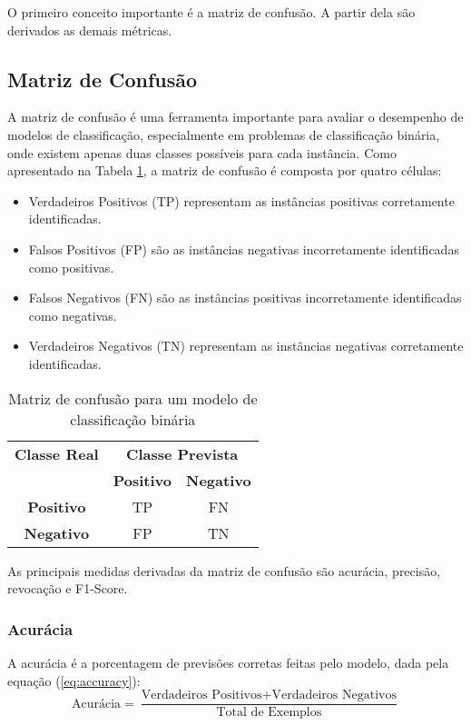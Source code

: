 O primeiro conceito importante é a matriz de confusão.  A partir dela são derivados as demais métricas.

\subsection{Matriz de Confusão}

A matriz de confusão é uma ferramenta importante para avaliar o desempenho de modelos de classificação, especialmente em problemas de classificação binária, onde existem apenas duas classes possíveis para cada instância. Como apresentado na Tabela \ref{tab:confusao}, a matriz de confusão é composta por quatro células:

\begin{itemize}
    \item Verdadeiros Positivos (TP) representam as instâncias positivas corretamente identificadas.
    \item Falsos Positivos (FP) são as instâncias negativas incorretamente identificadas como positivas.
    \item Falsos Negativos (FN) são as instâncias positivas incorretamente identificadas como negativas.
    \item Verdadeiros Negativos (TN) representam as instâncias negativas corretamente identificadas.
\end{itemize}

\begin{table}[h]
\centering
\caption{Matriz de confusão para um modelo de classificação binária}
\label{tab:confusao}
\begin{tabular}{c|cc}
\multicolumn{1}{c}{\textbf{Classe Real}} & \multicolumn{2}{c}{\textbf{Classe Prevista}} \\ \cline{2-3}
\multicolumn{1}{c|}{} & \textbf{Positivo} & \textbf{Negativo} \\ \hline
\textbf{Positivo} & TP & FN \\
\textbf{Negativo} & FP & TN \\ \hline
\end{tabular}
\end{table}

As principais medidas derivadas da matriz de confusão são acurácia, precisão, revocação e F1-Score.

\subsubsection{Acurácia}
A acurácia é a porcentagem de previsões corretas feitas pelo modelo, dada pela equação (\ref{eq:accuracy}):
\begin{equation}
\text{Acurácia} = \frac{\text{Verdadeiros Positivos} + \text{Verdadeiros Negativos}}{\text{Total de Exemplos}} \label{eq:accuracy}
\end{equation}

